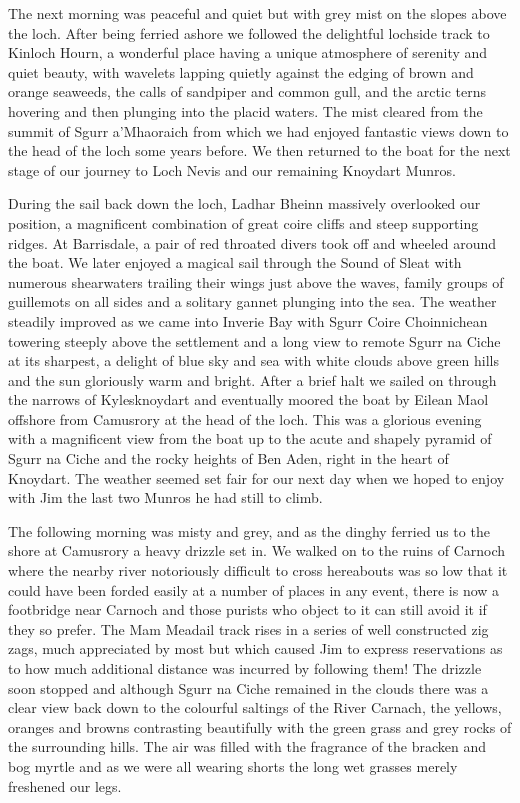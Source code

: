 \documentclass[a5paper,openany,font 10pt]{scrbook}
\begin{document}
The next morning was peaceful and quiet but with grey mist
on the slopes above the loch. After being ferried ashore we
followed the delightful lochside track to Kinloch Hourn, a
wonderful place having a unique atmosphere of serenity and quiet
beauty, with wavelets lapping quietly against the edging of brown
and orange seaweeds, the calls of sandpiper and common gull, and
the arctic terns hovering and then plunging into the placid
waters. The mist cleared from the summit of Sgurr a'Mhaoraich
from which we had enjoyed fantastic views down to the head of the
loch some years before. We then returned to the boat for the next
stage of our journey to Loch Nevis and our remaining Knoydart
Munros.

During the sail back down the loch, Ladhar Bheinn massively
overlooked our position, a magnificent combination of great coire
cliffs and steep supporting ridges. At Barrisdale, a pair of red
throated divers took off and wheeled around the boat. We later
enjoyed a magical sail through the Sound of Sleat with numerous
shearwaters trailing their wings just above the waves, family
groups of guillemots on all sides and a solitary gannet plunging
into the sea. The weather steadily improved as we came into
Inverie Bay with Sgurr Coire Choinnichean towering steeply above
the settlement and a long view to remote Sgurr na Ciche at its
sharpest, a delight of blue sky and sea with white clouds above
green hills and the sun gloriously warm and bright. After a brief
halt we sailed on through the narrows of Kylesknoydart and
eventually moored the boat by Eilean Maol offshore from Camusrory
at the head of the loch. This was a glorious evening with a
magnificent view from the boat up to the acute and shapely
pyramid of Sgurr na Ciche and the rocky heights of Ben Aden,
right in the heart of Knoydart. The weather seemed set fair for
our next day when we hoped to enjoy with Jim the last two Munros
he had still to climb.

The following morning was misty and grey, and as the dinghy
ferried us to the shore at Camusrory a heavy drizzle set in. We
walked on to the ruins of Carnoch where the nearby river
 notoriously difficult to cross hereabouts  was so low that it
 could have been forded easily at a number of places  in any
event, there is now a footbridge near Carnoch and those purists
who object to it can still avoid it if they so prefer. The Mam
Meadail track rises in a series of well constructed zig zags,
much appreciated by most but which caused Jim to express
reservations as to how much additional distance was incurred by
following them! The drizzle soon stopped and although Sgurr na
Ciche remained in the clouds there was a clear view back down to
the colourful saltings of the River Carnach, the yellows, oranges
and browns contrasting beautifully with the green grass and grey
rocks of the surrounding hills. The air was filled with the
fragrance of the bracken and bog myrtle and as we were all
wearing shorts the long wet grasses merely freshened our legs.
\end{document}

